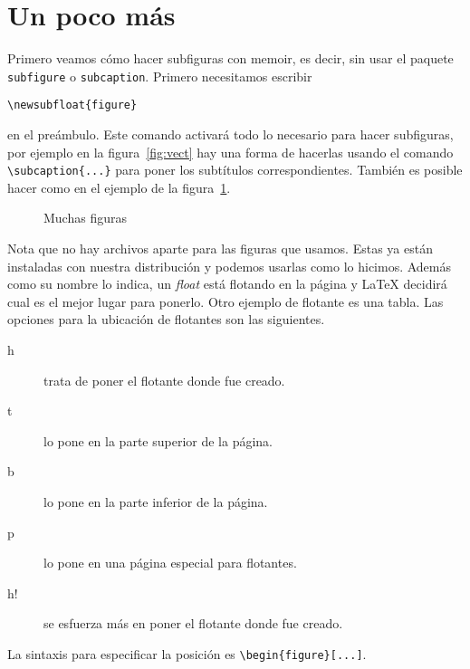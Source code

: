 \section{Un poco más}
Primero veamos cómo hacer subfiguras con memoir, es decir, sin usar el paquete
\texttt{subfigure} o \texttt{subcaption}. Primero necesitamos escribir
\begin{flushleft}
  \verb|\newsubfloat{figure}|
\end{flushleft}
en el preámbulo. Este comando activará todo lo necesario para hacer
subfiguras, por ejemplo en la figura~\ref{fig:vect} hay
una forma de hacerlas usando el comando \verb|\subcaption{...}| para poner
los subtítulos correspondientes. También es posible hacer como en el
ejemplo de la figura~\ref{fig:muchas}.
\begin{figure}
  \centering
  \caption{Muchas figuras}%
  \label{fig:muchas}
\end{figure}
Nota que no hay archivos aparte para las figuras que usamos. Estas ya están
instaladas con nuestra distribución y podemos usarlas como lo hicimos.
Además como su nombre lo indica, un \textit{float} está flotando en la
página y \LaTeX{} decidirá cual es el mejor lugar para ponerlo. Otro ejemplo
de flotante es una tabla. Las opciones para la ubicación de flotantes son
las siguientes.
\begin{description}
  \item [h] trata de poner el flotante donde fue creado.
  \item [t] lo pone en la parte superior de la página.
  \item [b] lo pone en la parte inferior de la página.
  \item [p] lo pone en una página especial para flotantes.
  \item [h!] se esfuerza más en poner el flotante donde fue creado.
\end{description}
La sintaxis para especificar la posición es \verb|\begin{figure}[...]|.

